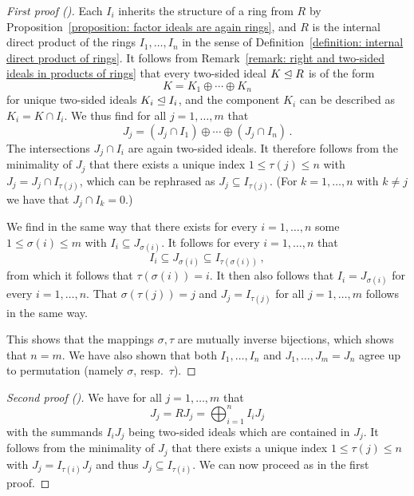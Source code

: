 \begin{proof}[First proof ({\cite[Lemma~3.8]{Lam1991First}})]
  Each $I_i$ inherits the structure of a ring from $R$ by Proposition~\ref{proposition: factor ideals are again rings}, and $R$ is the internal direct product of the rings $I_1, \dotsc, I_n$ in the sense of Definition~\ref{definition: internal direct product of rings}.
  It follows from Remark~\ref{remark: right and two-sided ideals in products of rings} that every two-sided ideal $K \trianglelefteq R$ is of the form
  \[
    K = K_1 \oplus \dotsb \oplus K_n
  \]
  for unique two-sided ideals $K_i \trianglelefteq I_i$, and the component $K_i$ can be described as $K_i = K \cap I_i$.
  We thus find for all $j = 1, \dotsc, m$ that
  \[
    J_j = (J_j \cap I_1) \oplus \dotsb \oplus (J_j \cap I_n) \,.
  \]
  The intersections $J_j \cap I_i$ are again two-sided ideals.
  It therefore follows from the minimality of $J_j$ that there exists a unique index $1 \leq \tau(j) \leq n$ with $J_j = J_j \cap I_{\tau(j)}$, which can be rephrased as $J_j \subseteq I_{\tau(j)}$.
  (For $k = 1, \dotsc, n$ with $k \neq j$ we have that $J_j \cap I_k = 0$.)
  
  We find in the same way that there exists for every $i = 1, \dotsc, n$ some $1 \leq \sigma(i) \leq m$ with $I_i \subseteq J_{\sigma(i)}$.
  It follows for every $i = 1, \dotsc, n$ that
  \[
              I_i
    \subseteq J_{\sigma(i)}
    \subseteq I_{\tau(\sigma(i))} \,,
  \]
  from which it follows that $\tau(\sigma(i)) = i$.
  It then also follows that $I_i = J_{\sigma(i)}$ for every $i = 1, \dotsc, n$.
  That $\sigma(\tau(j)) = j$ and $J_j = I_{\tau(j)}$ for all $j = 1, \dotsc, m$ follows in the same way.
  
  This shows that the mappings $\sigma, \tau$ are mutually inverse bijections, which shows that $n = m$.
  We have also shown that both $I_1, \dotsc, I_n$ and $J_1, \dotsc, J_m = J_n$ agree up to permutation (namely $\sigma$, resp.\ $\tau$).
\end{proof}


\begin{proof}[Second proof ({\cite[Theorem~1.13]{FarbDennis1993}})]
  We have for all $j = 1, \dotsc, m$ that
  \[
      J_j
    = R J_j
    = \bigoplus_{i=1}^n I_i J_j    
  \]
  with the summands $I_i J_j$ being two-sided ideals which are contained in $J_j$.
  It follows from the minimality of $J_j$ that there exists a unique index $1 \leq \tau(j) \leq n$  with $J_j = I_{\tau(i)} J_j$ and thus $J_j \subseteq I_{\tau(i)}$.
  We can now proceed as in the first proof.
\end{proof}


